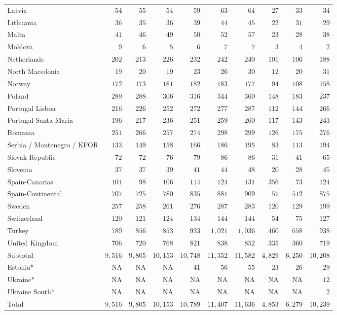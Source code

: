 \documentclass[
  11pt,
  a4paper,
]{book}
\begin{document}
\begin{longtable}{lrrrrrrrrr}
Latvia & $54$ & $55$ & $54$ & $59$ & $63$ & $64$ & $27$ & $33$ & $34$ \\ 
Lithuania & $36$ & $35$ & $36$ & $39$ & $44$ & $45$ & $22$ & $31$ & $29$ \\ 
Malta & $41$ & $46$ & $49$ & $50$ & $52$ & $57$ & $23$ & $28$ & $38$ \\ 
Moldova & $9$ & $6$ & $5$ & $6$ & $7$ & $7$ & $3$ & $4$ & $2$ \\ 
Netherlands & $202$ & $213$ & $226$ & $232$ & $242$ & $240$ & $101$ & $106$ & $188$ \\ 
North Macedonia & $19$ & $20$ & $19$ & $23$ & $26$ & $30$ & $12$ & $20$ & $31$ \\ 
Norway & $172$ & $173$ & $181$ & $182$ & $183$ & $177$ & $94$ & $108$ & $158$ \\ 
Poland & $289$ & $288$ & $306$ & $316$ & $344$ & $360$ & $148$ & $183$ & $237$ \\ 
Portugal Lisboa & $216$ & $226$ & $252$ & $272$ & $277$ & $287$ & $112$ & $144$ & $266$ \\ 
Portugal Santa Maria & $196$ & $217$ & $236$ & $251$ & $259$ & $260$ & $117$ & $143$ & $243$ \\ 
Romania & $251$ & $266$ & $257$ & $274$ & $298$ & $299$ & $126$ & $175$ & $276$ \\ 
Serbia / Montenegro / KFOR & $133$ & $149$ & $158$ & $166$ & $186$ & $195$ & $83$ & $113$ & $194$ \\ 
Slovak Republic & $72$ & $72$ & $76$ & $79$ & $86$ & $86$ & $31$ & $41$ & $65$ \\ 
Slovenia & $37$ & $37$ & $39$ & $41$ & $44$ & $48$ & $20$ & $28$ & $45$ \\ 
Spain-Canarias & $101$ & $98$ & $106$ & $114$ & $124$ & $131$ & $356$ & $73$ & $124$ \\ 
Spain-Continental & $707$ & $725$ & $780$ & $835$ & $881$ & $909$ & $57$ & $512$ & $875$ \\ 
Sweden & $257$ & $258$ & $261$ & $276$ & $287$ & $283$ & $120$ & $129$ & $199$ \\ 
Switzerland & $120$ & $121$ & $124$ & $134$ & $144$ & $144$ & $54$ & $75$ & $127$ \\ 
Turkey & $789$ & $856$ & $853$ & $933$ & $1,021$ & $1,036$ & $460$ & $658$ & $938$ \\ 
United Kingdom & $706$ & $720$ & $768$ & $821$ & $838$ & $852$ & $335$ & $360$ & $719$ \\ 
Subtotal & $9,516$ & $9,805$ & $10,153$ & $10,748$ & $11,352$ & $11,582$ & $4,829$ & $6,250$ & $10,208$ \\ 
Estonia* & NA & NA & NA & $41$ & $56$ & $55$ & $23$ & $26$ & $29$ \\ 
Ukraine* & NA & NA & NA & NA & NA & NA & NA & NA & $12$ \\ 
Ukraine South* & NA & NA & NA & NA & NA & NA & NA & NA & $2$ \\ 
Total & $9,516$ & $9,805$ & $10,153$ & $10,789$ & $11,407$ & $11,636$ & $4,853$ & $6,279$ & $10,239$ \\ 
\bottomrule
\end{longtable}
\end{document}
